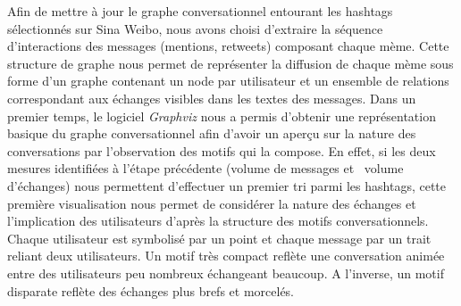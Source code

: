 Afin de mettre \`a jour le graphe conversationnel entourant les hashtags
s\'electionn\'es sur Sina Weibo, nous avons choisi
d{\textquoteright}extraire la s\'equence d{\textquoteright}interactions
des messages (mentions, retweets) composant chaque m\`eme. Cette
structure de graphe nous permet de repr\'esenter la diffusion de chaque
m\`eme sous forme d{\textquoteright}un graphe contenant un node par
utilisateur et un ensemble de relations correspondant aux \'echanges
visibles dans les textes des messages. Dans un premier temps, le
logiciel \textit{Graphviz }nous a permis d{\textquoteright}obtenir une
repr\'esentation basique du graphe conversationnel afin
d{\textquoteright}avoir un aper\c{c}u sur la nature des conversations
par l{\textquoteright}observation des motifs qui la compose. En effet,
si les deux mesures identifi\'ees \`a l{\textquoteright}\'etape
pr\'ec\'edente (volume de messages et \ volume
d{\textquoteright}\'echanges) nous permettent
d{\textquoteright}effectuer un premier tri parmi les hashtags, cette
premi\`ere visualisation nous permet de consid\'erer la nature des
\'echanges et l{\textquoteright}implication des utilisateurs
d{\textquoteright}apr\`es la structure des motifs conversationnels.
Chaque utilisateur est symbolis\'e par un point et chaque message par
un trait reliant deux utilisateurs. Un motif tr\`es compact refl\`ete
une conversation anim\'ee entre des utilisateurs peu nombreux
\'echangeant beaucoup. A l{\textquoteright}inverse, un motif disparate
refl\`ete des \'echanges plus brefs et morcel\'es.

